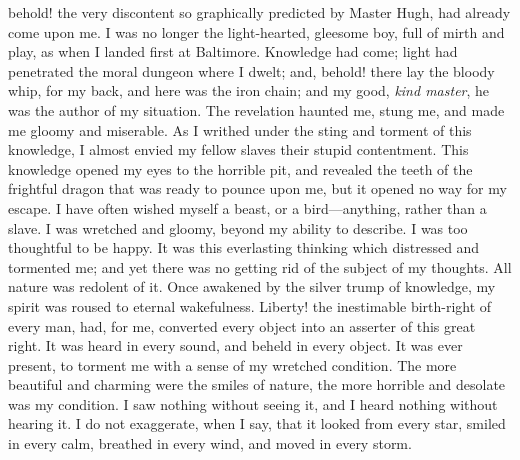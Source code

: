 behold! the very discontent so graphically predicted by Master Hugh, had
already come upon me. I was no longer the light-hearted, gleesome boy,
full of mirth and play, as when I landed first at Baltimore. Knowledge
had {\protect\hypertarget{160}{}{}}come; light had penetrated the moral
dungeon where I dwelt; and, behold! there lay the bloody whip, for my
back, and here was the iron chain; and my good, \emph{kind master}, he
was the author of my situation. The revelation haunted me, stung me, and
made me gloomy and miserable. As I writhed under the sting and torment
of this knowledge, I almost envied my fellow slaves their stupid
contentment. This knowledge opened my eyes to the horrible pit, and
revealed the teeth of the frightful dragon that was ready to pounce upon
me, but it opened no way for my escape. I have often wished myself a
beast, or a bird---anything, rather than a slave. I was wretched and
gloomy, beyond my ability to describe. I was too thoughtful to be happy.
It was this everlasting thinking which distressed and tormented me; and
yet there was no getting rid of the subject of my thoughts. All nature
was redolent of it. Once awakened by the silver trump of knowledge, my
spirit was roused to eternal wakefulness. Liberty! the inestimable
birth-right of every man, had, for me, converted every object into an
asserter of this great right. It was heard in every sound, and beheld in
every object. It was ever present, to torment me with a sense of my
wretched condition. The more beautiful and charming were the smiles of
nature, the more horrible and desolate was my condition. I saw nothing
without seeing it, and I heard nothing without hearing it. I do not
exaggerate, when I say, that it looked from every star, smiled in every
calm, breathed in every wind, and moved in every storm.

